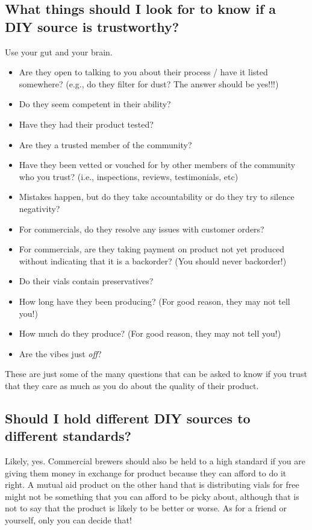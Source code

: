 \documentclass{article}
\begin{document}
\subsection{What things should I look for to know if a DIY source is trustworthy?}

Use your gut and your brain. 

\begin{itemize}
  \item Are they open to talking to you about their process / have it listed somewhere? (e.g., do they filter for dust? The answer should be yes!!!)
  \item Do they seem competent in their ability?
  \item Have they had their product tested? 
  \item Are they a trusted member of the community?
  \item Have they been vetted or vouched for by other members of the community who you trust? (i.e., inspections, reviews, testimonials, etc)
  \item Mistakes happen, but do they take accountability or do they try to silence negativity?
  \item For commercials, do they resolve any issues with customer orders?
  \item For commercials, are they taking payment on product not yet produced without indicating that it is a backorder? (You should never backorder!)
  \item Do their vials contain preservatives?
  \item How long have they been producing? (For good reason, they may not tell you!)
  \item How much do they produce? (For good reason, they may not tell you!)
  \item Are the vibes just \textit{off}?
\end{itemize}

These are just some of the many questions that can be asked to know if you trust that they care as much as you do about the quality of their product.

\subsection{Should I hold different DIY sources to different standards?}

Likely, yes. Commercial brewers should also be held to a high standard if you are giving them money in exchange for product because they can afford to do it right. A mutual aid product on the other hand that is distributing vials for free might not be something that you can afford to be picky about, although that is not to say that the product is likely to be better or worse. As for a friend or yourself, only you can decide that!
\end{document}
